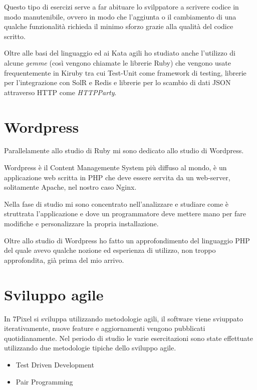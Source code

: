 Questo tipo di esercizi serve a far abituare
lo svilppatore a scrivere codice in modo manutenibile, ovvero in modo che l'aggiunta o il cambiamento di una qualche 
funzionalità richieda il minimo sforzo grazie alla qualità del codice scritto.

Oltre alle basi del linguaggio ed ai Kata agili ho studiato anche l'utilizzo di alcune \emph{gemme} (così vengono chiamate le 
librerie Ruby) che vengono
usate frequentemente in Kiruby tra cui Test-Unit come framework di testing, librerie per l'integrazione
con SolR e Redis e librerie per lo scambio di dati JSON attraverso HTTP come \emph{HTTPParty}.

\section{Wordpress}

Parallelamente allo studio di Ruby mi sono dedicato allo studio di Wordpress.

Wordpress è il Content Managemente System più diffuso al mondo, è un applicazione web scritta in PHP
che deve essere servita da un web-server, solitamente Apache, nel nostro caso Nginx.

Nella fase di studio mi sono concentrato nell'analizzare e studiare come è struttrata l'applicazione
e dove un programmatore deve mettere mano per fare modifiche e personalizzare la propria installazione.

Oltre allo studio di Wordpress ho fatto un approfondimento del linguaggio PHP del quale avevo qualche
nozione ed esperienza di utilizzo, non troppo approfondita, già prima del mio arrivo. 





\section{Sviluppo agile}

In 7Pixel si sviluppa utilizzando metodologie agili, il software viene sviuppato
iterativamente, nuove feature e aggiornamenti vengono pubblicati quotidianamente.
Nel periodo di studio le varie esercitazioni sono state effettuate
utilizzando due metodologie tipiche dello sviluppo agile.

\begin{itemize}
\item Test Driven Development
\item Pair Programming
\end{itemize}

